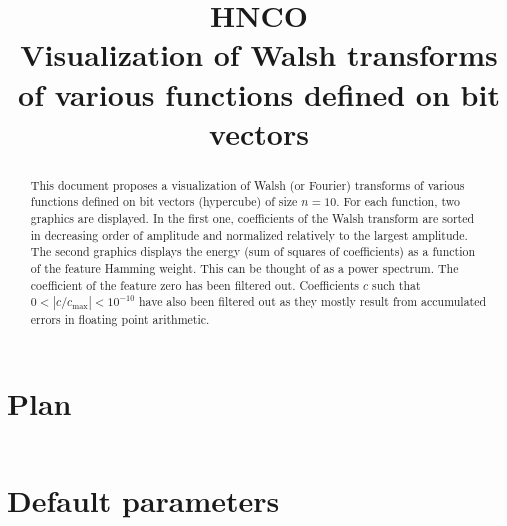 \documentclass[a4paper]{article}
\begin{document}

\title{HNCO\\
  Visualization of Walsh transforms\\
  of various functions defined on bit vectors}
\maketitle

\begin{abstract}
  This document proposes a visualization of Walsh (or Fourier)
  transforms of various functions defined on bit vectors (hypercube)
  of size $n=10$. For each function, two graphics are displayed. In
  the first one, coefficients of the Walsh transform are sorted in
  decreasing order of amplitude and normalized relatively to the
  largest amplitude. The second graphics displays the energy (sum of
  squares of coefficients) as a function of the feature Hamming
  weight. This can be thought of as a power spectrum. The coefficient
  of the feature zero has been filtered out. Coefficients $c$ such
  that $0 < |c/c_{\max}| < 10^{-10}$ have also been filtered out as
  they mostly result from accumulated errors in floating point
  arithmetic.
\end{abstract}

\tableofcontents



\appendix

\section{Plan}

\inputminted[breaklines=true]{json}{../pretty.json}

\section{Default parameters}

\inputminted[breaklines=true]{text}{../log.defaults}
\end{document}
